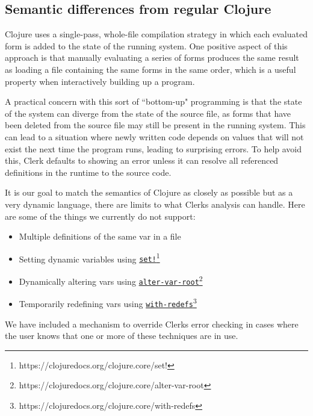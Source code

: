 \documentclass[sigconf,screen]{acmart}
\newcommand{\passthrough}[1]{#1}
\providecommand{\tightlist}{%
  \setlength{\itemsep}{0pt}\setlength{\parskip}{0pt}}
\begin{document}
\hypertarget{semantic-differences-from-regular-clojure}{%
\subsection{Semantic differences from regular Clojure}\label{semantic-differences-from-regular-clojure}}

Clojure uses a single-pass, whole-file compilation strategy in which each evaluated form is added to the state of the running system. One positive aspect of this approach is that manually evaluating a series of forms produces the same result as loading a file containing the same forms in the same order, which is a useful property when interactively building up a program.

A practical concern with this sort of ``bottom-up" programming is that the state of the system can diverge from the state of the source file, as forms that have been deleted from the source file may still be present in the running system. This can lead to a situation where newly written code depends on values that will not exist the next time the program runs, leading to surprising errors. To help avoid this, Clerk defaults to showing an error unless it can resolve all referenced definitions in the runtime to the source code.

It is our goal to match the semantics of Clojure as closely as possible but as a very dynamic language, there are limits to what Clerk\textquotesingle s analysis can handle. Here are some of the things we currently do not support:

\begin{itemize}
\tightlist
\item
  Multiple definitions of the same var in a file
\item
  Setting dynamic variables using {\href{https://clojuredocs.org/clojure.core/set!}{\passthrough{\lstinline"set!"}}\footnote{https://clojuredocs.org/clojure.core/set!}}
\item
  Dynamically altering vars using {\href{https://clojuredocs.org/clojure.core/alter-var-root}{\passthrough{\lstinline!alter-var-root!}}\footnote{https://clojuredocs.org/clojure.core/alter-var-root}}
\item
  Temporarily redefining vars using {\href{https://clojuredocs.org/clojure.core/with-redefs}{\passthrough{\lstinline!with-redefs!}}\footnote{https://clojuredocs.org/clojure.core/with-redefs}}
\end{itemize}

We have included a mechanism to override Clerk\textquotesingle s error checking in cases where the user knows that one or more of these techniques are in use.
\end{document}
